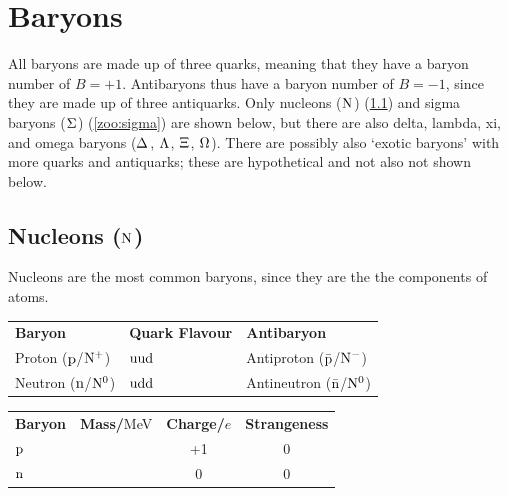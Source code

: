 \section{Baryons} \label{zoo:baryons}
    All baryons are made up of three quarks, meaning that they have a baryon number of $B=+1$.
    Antibaryons thus have a baryon number of $B=-1$, since they are made up of three antiquarks.
    Only nucleons ($\nucleon$) (\ref{zoo:nucleons}) and sigma baryons ($\sigmabaryon$) (\ref{zoo:sigma}) are shown below, but there are also delta, lambda, xi, and omega baryons ($\deltabaryon$, $\lambdabaryon$, $\xibaryon$, $\omegabaryon$).
    There are possibly also `exotic baryons' with more quarks and antiquarks; these are hypothetical and not also not shown below. \\

    \subsection{Nucleons (\texorpdfstring{$\nucleon$}.)} \label{zoo:nucleons}
        Nucleons are the most common baryons, since they are the the components of atoms. \\

        \begin{center}
        \begin{tabular}{l l l}
            \textbf{Baryon}                    & \textbf{Quark Flavour} & \textbf{Antibaryon}                        \\
            Proton ($\proton$/$\nucleon[+]$)   & $\baryonquarks[uud]$   & Antiproton ($\antiproton$/$\nucleon[-]$)   \\
            Neutron ($\neutron$/$\nucleon[0]$) & $\baryonquarks[udd]$   & Antineutron ($\antineutron$/$\nucleon[0]$)
        \end{tabular}
        \end{center}

        \begin{center}
        \begin{tabular}{l c c c}
            \textbf{Baryon} & \textbf{Mass/}MeV & \textbf{Charge/}$e$ & \textbf{Strangeness} \\
            $\proton$       &                   & +1                  & 0 \\
            $\neutron$      &                   & 0                   & 0 \\
        \end{tabular}
        \end{center}

